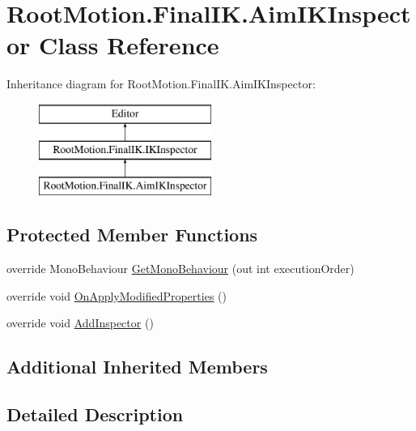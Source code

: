 \hypertarget{class_root_motion_1_1_final_i_k_1_1_aim_i_k_inspector}{}\section{Root\+Motion.\+Final\+I\+K.\+Aim\+I\+K\+Inspector Class Reference}
\label{class_root_motion_1_1_final_i_k_1_1_aim_i_k_inspector}
Inheritance diagram for Root\+Motion.\+Final\+I\+K.\+Aim\+I\+K\+Inspector\+:\begin{figure}[H]
\begin{center}
\leavevmode
\includegraphics[height=3.000000cm]{class_root_motion_1_1_final_i_k_1_1_aim_i_k_inspector}
\end{center}
\end{figure}
\subsection*{Protected Member Functions}
\begin{DoxyCompactItemize}
\item 
override Mono\+Behaviour \mbox{\hyperlink{class_root_motion_1_1_final_i_k_1_1_aim_i_k_inspector_a52c15b4c53fd1abe0ca8cafc3fe9bd2a}{Get\+Mono\+Behaviour}} (out int execution\+Order)
\item 
override void \mbox{\hyperlink{class_root_motion_1_1_final_i_k_1_1_aim_i_k_inspector_a49f6b6386293ca03782ebd2b9394494e}{On\+Apply\+Modified\+Properties}} ()
\item 
override void \mbox{\hyperlink{class_root_motion_1_1_final_i_k_1_1_aim_i_k_inspector_a38161555789256bb549928855fd891c1}{Add\+Inspector}} ()
\end{DoxyCompactItemize}
\subsection*{Additional Inherited Members}


\subsection{Detailed Description}


